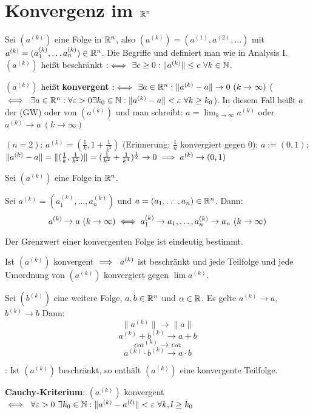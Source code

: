 \documentclass[a4paper,twoside,DIV15,BCOR12mm,chapterprefix=true,headings=twolinechapter]{scrbook}
\begin{document}
\chapter{Konvergenz im $\mathbb{R}^n$}

Sei $(a^{(k)})$ eine Folge in $\mathbb{R}^n$, also $(a^{(k)}) = ( a^{(1)}, a^{(2)}, \ldots ) $ mit $a^{(k)} = (a_1^{(k)}, \ldots a_n^{(k)}) \in \mathbb{R}^n$. Die Begriffe  und  definiert man wie in Analysis I. $(a^{(k)})$ heißt beschränkt $:\iff$ $\exists c\ge0: \|a^{(k)}\| \le c  \ \forall k\in\mathbb{N}$.

\begin{definition*}
$(a^{(k)})$ heißt \textbf{konvergent} $:\iff$ $\exists a\in\mathbb{R}^n: \|a^{(k)} - a\| \to 0 \ (k\to\infty)$ ($\iff\ \exists a\in\mathbb{R}^n: \forall \varepsilon>0\exists k_0 \in\mathbb{N}: \|a^{(k)} - a\|<\varepsilon \ \forall k\ge k_0$). In diesem Fall heißt $a$ der  (GW) oder  von $(a^{(k)})$ und man schreibt: $a=\lim_{k\to\infty}a^{(k)}$ oder $a^{(k)} \to a \ (k\to\infty)$
\end{definition*}

\begin{beispiel}
$(n=2)$: $a^{(k)} = (\frac{1}{k}, 1+\frac{1}{k^2})$ (Erinnerung: $\frac{1}{n}$ konvergiert gegen 0); $a := (0,1)$; $\|a^{(k)} - a \| = \|(\frac{1}{k} , \frac{1}{k^2})\| = (\frac{1}{k^2} + \frac{1}{k^4})^\frac{1}{2} \to 0 \implies a^{(k)} \to (0,1)$
\end{beispiel}
\begin{satz}[Konvergenz]
Sei $(a^{(k)})$ eine Folge in $\mathbb{R}^n$.
\begin{liste}
 \item Sei $a^{(k)} = (a_1^{(k)}, \ldots, a_n^{(k)})$ und $a = (a_1,\ldots,a_n)\in\mathbb{R}^n$. Dann:
 $$ a^{(k)} \to a \ (k\to\infty) \iff a_1^{(k)} \to a_1, \ldots, a_n^{(k)} \to a_n \ (k\to\infty) $$
 \item Der Grenzwert einer konvergenten Folge ist eindeutig bestimmt.
 \item Ist $(a^{(k)})$ konvergent $\implies \ a^{(k)}$ ist beschränkt und jede Teilfolge und jede Umordnung von $(a^{(k)})$ konvergiert gegen $\lim a^{(k)}$.
 \item Sei $(b^{(k)})$ eine weitere Folge, $a,b\in\mathbb{R}^n$ und $\alpha\in\mathbb{R}$. Es gelte $a^{(k)}\to a$, $b^{(k)} \to b$ Dann: $$\|a^{(k)}\| \to \|a\|$$ $$a^{(k)} + b ^{(k)} \to a+b$$ $$\alpha a^{(k)} \to \alpha a$$ $$a^{(k)}\cdot b^{(k)} \to a\cdot b$$
 \item {}: Ist $(a^{(k)})$ beschränkt, so enthält $(a^{(k)})$ eine konvergente Teilfolge.
 \item {}\textbf{Cauchy-Kriterium}: $(a^{(k)})$ konvergent $\iff \ \forall\varepsilon>0\ \exists k_0\in\mathbb{N}: \|a^{(k)} - a^{(l)}\| <\varepsilon \ \forall k,l \ge k_0$
\end{liste}
\end{satz}
\end{document}
